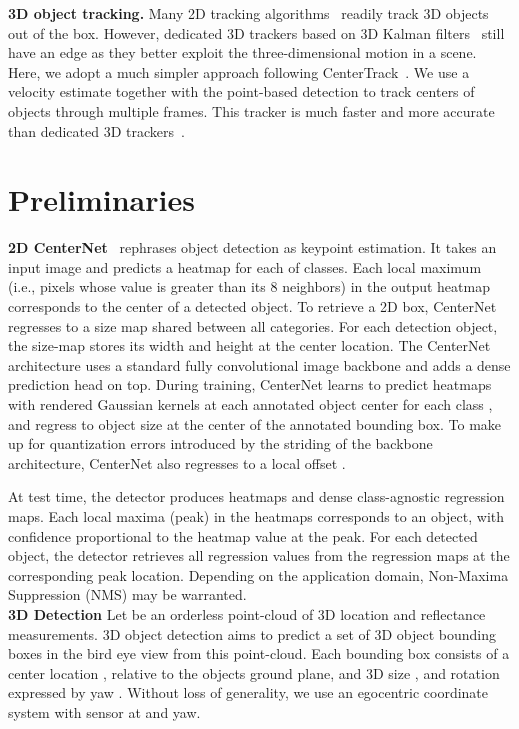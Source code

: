 \documentclass[final]{cvpr}
\begin{document}
\noindent 
\textbf{3D object tracking.} Many 2D tracking algorithms~\cite{mass, sort, deep_sort, tractor} readily track 3D objects out of the box.
However, dedicated 3D trackers based on 3D Kalman filters~\cite{weng2019baseline,chiu2020probabilistic} still have an edge as they better exploit the three-dimensional motion in a scene.
Here, we adopt a much simpler approach following CenterTrack~\cite{zhou2020tracking}.
We use a velocity estimate together with the point-based detection to track centers of objects through multiple frames.
This tracker is much faster and more accurate than dedicated 3D trackers~\cite{weng2019baseline,chiu2020probabilistic}.

\section{Preliminaries}

\noindent
\textbf{2D CenterNet}~\cite{zhou2019objects} rephrases object detection as keypoint estimation.
It takes an input image and predicts a  heatmap  for each of  classes.
Each local maximum (i.e., pixels whose value is greater than its 8 neighbors) in the output heatmap corresponds to the center of a detected object.
To retrieve a 2D box, CenterNet regresses to a size map  shared between all categories.
For each detection object, the size-map stores its width and height at the center location.
The CenterNet architecture uses a standard fully convolutional image backbone and adds a dense prediction head on top.
During training, CenterNet learns to predict heatmaps with rendered Gaussian kernels at each annotated object center  for each class , and regress to object size  at the center of the annotated bounding box.
To make up for quantization errors introduced by the striding of the backbone architecture, CenterNet also regresses to a local offset .

At test time, the detector produces  heatmaps and dense class-agnostic regression maps.
Each local maxima (peak) in the heatmaps corresponds to an object, with confidence proportional to the heatmap value at the peak.
For each detected object, the detector retrieves all regression values from the regression maps at the corresponding peak location.
Depending on the application domain, Non-Maxima Suppression (NMS) may be warranted.\\

\noindent 
\textbf{3D Detection}
Let  be an orderless point-cloud of 3D location  and reflectance  measurements.
3D object detection aims to predict a set of 3D object bounding boxes  in the bird eye view from this point-cloud.
Each bounding box  consists of a center location , relative to the objects ground plane, and 3D size , and rotation expressed by yaw .
Without loss of generality, we use an egocentric coordinate system with sensor at  and yaw.
\end{document}
